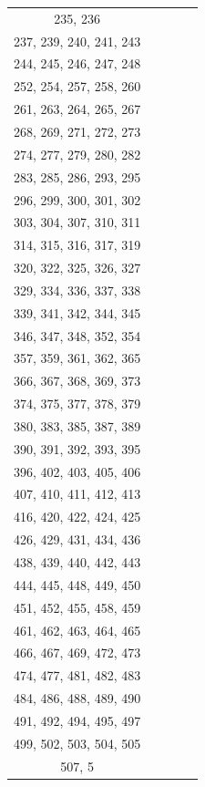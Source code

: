 \documentclass{article}
\begin{document}
\begin{table}[h]
\begin{tabular}{c|c|c|c|c}
235, 236\\237, 239, 240, 241, 243\\244, 245, 246, 247, 248\\252, 254, 257, 258, 260\\261, 263, 264, 265, 267\\268, 269, 271, 272, 273\\274, 277, 279, 280, 282\\283, 285, 286, 293, 295\\296, 299, 300, 301, 302\\303, 304, 307, 310, 311\\314, 315, 316, 317, 319\\320, 322, 325, 326, 327\\329, 334, 336, 337, 338\\339, 341, 342, 344, 345\\346, 347, 348, 352, 354\\357, 359, 361, 362, 365\\366, 367, 368, 369, 373\\374, 375, 377, 378, 379\\380, 383, 385, 387, 389\\390, 391, 392, 393, 395\\396, 402, 403, 405, 406\\407, 410, 411, 412, 413\\416, 420, 422, 424, 425\\426, 429, 431, 434, 436\\438, 439, 440, 442, 443\\444, 445, 448, 449, 450\\451, 452, 455, 458, 459\\461, 462, 463, 464, 465\\466, 467, 469, 472, 473\\474, 477, 481, 482, 483\\484, 486, 488, 489, 490\\491, 492, 494, 495, 497\\499, 502, 503, 504, 505\\507, 5
\end{tabular}
\end{table}
\end{document}
